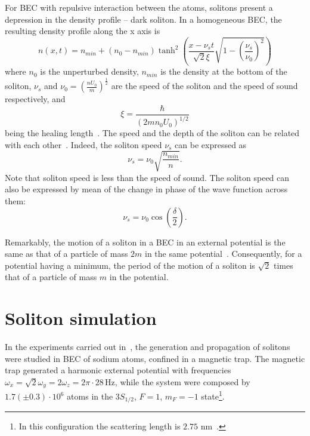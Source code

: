 For BEC with repulsive interaction between the atoms, solitons present a depression in the density profile -- dark soliton. In a homogeneous BEC, the resulting density profile along the x axis is
\begin{equation}
n(x,t) = n_{min} + \left(n_0 - n_{min}\right)\tanh^2 \left( \frac{x - \nu_s t}{\sqrt{2} \xi} \sqrt{1 - \left( \frac{\nu_s}{\nu_0} \right)^2 } \right)
\end{equation}
where $n_0$ is the unperturbed density, $n_{min}$ is the density at the bottom of the soliton, $\nu_s$ and  $\nu_0 = (\frac{nU_0}{m})^{\frac{1}{2}}$ are the speed of the soliton and the speed of sound respectively, and 
\begin{equation}
\xi = \frac{\hbar}{\left( 2mn_0 U_0 \right)^{1/2}}
\end{equation}
being the healing length~\citep{pethick2002bose}.
The speed and the depth of the soliton can be related with each other~\citep{RC97,JKP98}. Indeed, the soliton speed $\nu_s$ can be expressed as
\begin{equation} \label{eq:soliton-speed-density}
\nu_s = \nu_0 \sqrt{ \frac{n_{min}}{n} }.
\end{equation}
Note that soliton speed is less than the speed of sound.
The soliton speed can also be expressed by mean of the change in phase of the wave function across them:
\begin{equation}
\nu_s = \nu_0 \cos \left( \frac{\delta}{2} \right).
\end{equation}

Remarkably, the motion of a soliton in a BEC in an external potential is the same as that of a particle of mass $2m$ in the same potential~\citep{pethick2002bose}.
Consequently, for a potential having a minimum, the period of the motion of a soliton is $\sqrt{2}$ times that of a particle of mass $m$ in the potential.

\section{Soliton simulation}
In the experiments carried out in~\citep{DSF00}, the generation and propagation of solitons were studied in BEC of sodium atoms, confined in a magnetic trap. The magnetic trap generated a harmonic external potential with frequencies $\omega_x = \sqrt{2}\omega_y = 2 \omega_z = 2 \pi \cdot 28\,$Hz, while the system were composed by  $1.7 (\pm 0.3) \cdot 10^6$ atoms in the $3S_{1/2}$, $F=1$, $m_F=-1$ state\footnote{In this configuration the scattering length is $2.75$ nm~\citep{DSF00}.}. 


